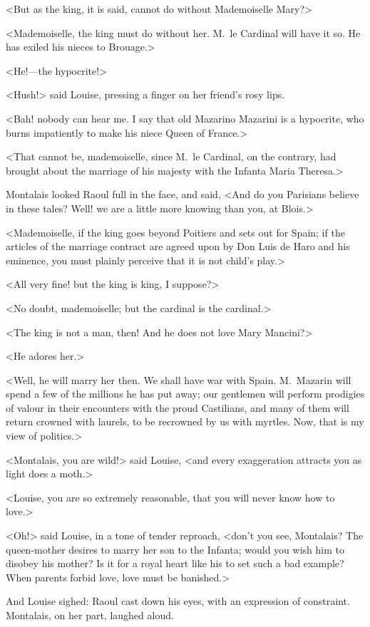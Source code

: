 <But as the king, it is said, cannot do without Mademoiselle Mary?>

<Mademoiselle, the king must do without her. M.~le Cardinal will have it so. He has exiled his nieces to Brouage.>

<He!—the hypocrite!>

<Hush!> said Louise, pressing a finger on her friend's rosy lips.

<Bah! nobody can hear me. I say that old Mazarino Mazarini is a hypocrite, who burns impatiently to make his niece Queen of France.>

<That cannot be, mademoiselle, since M.~le Cardinal, on the contrary, had brought about the marriage of his majesty with the Infanta Maria Theresa.>

Montalais looked Raoul full in the face, and said, <And do you Parisians believe in these tales? Well! we are a little more knowing than you, at Blois.>

<Mademoiselle, if the king goes beyond Poitiers and sets out for Spain; if the articles of the marriage contract are agreed upon by Don Luis de Haro and his eminence, you must plainly perceive that it is not child's play.>

<All very fine! but the king is king, I suppose?>

<No doubt, mademoiselle; but the cardinal is the cardinal.>

<The king is not a man, then! And he does not love Mary Mancini?>

<He adores her.>

<Well, he will marry her then. We shall have war with Spain. M.~Mazarin will spend a few of the millions he has put away; our gentlemen will perform prodigies of valour in their encounters with the proud Castilians, and many of them will return crowned with laurels, to be recrowned by us with myrtles. Now, that is my view of politics.>

<Montalais, you are wild!> said Louise, <and every exaggeration attracts you as light does a moth.>

<Louise, you are so extremely reasonable, that you will never know how to love.>

<Oh!> said Louise, in a tone of tender reproach, <don't you see, Montalais? The queen-mother desires to marry her son to the Infanta; would you wish him to disobey his mother? Is it for a royal heart like his to set such a bad example? When parents forbid love, love must be banished.>

And Louise sighed: Raoul cast down his eyes, with an expression of constraint. Montalais, on her part, laughed aloud.

